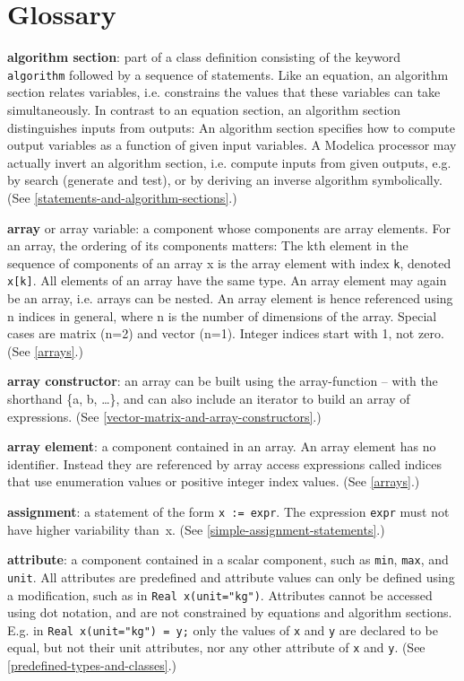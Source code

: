 \chapter{Glossary}
\textbf{algorithm section}: part of a class definition consisting of the
keyword \lstinline!algorithm! followed by a sequence of statements. Like an
equation, an algorithm section relates variables, i.e. constrains the
values that these variables can take simultaneously. In contrast to an
equation section, an algorithm section distinguishes inputs from
outputs: An algorithm section specifies how to compute output variables
as a function of given input variables. A Modelica processor may
actually invert an algorithm section, i.e. compute inputs from given
outputs, e.g. by search (generate and test), or by deriving an inverse
algorithm symbolically. (See \autoref{statements-and-algorithm-sections}.)

\textbf{array} or array variable: a component whose components are array
elements. For an array, the ordering of its components matters: The kth
element in the sequence of components of an array x is the array element
  with index \lstinline!k!, denoted \lstinline!x[k]!. All elements of an array have the same
  type. An array element may again be an array, i.e. arrays can be nested.
An array element is hence referenced using n indices in general, where n
is the number of dimensions of the array. Special cases are matrix (n=2)
and vector (n=1). Integer indices start with 1, not zero. (See \autoref{arrays}.)

\textbf{array constructor}: an array can be built using the
array-function -- with the shorthand \{a, b, \ldots{}\}, and can also
include an iterator to build an array of expressions. (See \autoref{vector-matrix-and-array-constructors}.)

\textbf{array element}: a component contained in an array. An array
element has no identifier. Instead they are referenced by array access
expressions called indices that use enumeration values or positive
integer index values. (See \autoref{arrays}.)

\textbf{assignment}: a statement of the form \lstinline!x := expr!. The expression
\lstinline!expr! must not have higher variability than~x. (See \autoref{simple-assignment-statements}.)

\textbf{attribute}: a component contained in a scalar component, such as
\lstinline!min!, \lstinline!max!, and \lstinline!unit!. All attributes are predefined and attribute values
can only be defined using a modification, such as in \lstinline!Real x(unit="kg")!.
Attributes cannot be accessed using dot notation, and are not
constrained by equations and algorithm sections. E.g. in \lstinline!Real x(unit="kg") = y;! only the values of \lstinline!x! and
\lstinline!y! are declared to be equal,
but not their unit attributes, nor any other attribute of \lstinline!x! and \lstinline!y!. (See
\autoref{predefined-types-and-classes}.)

